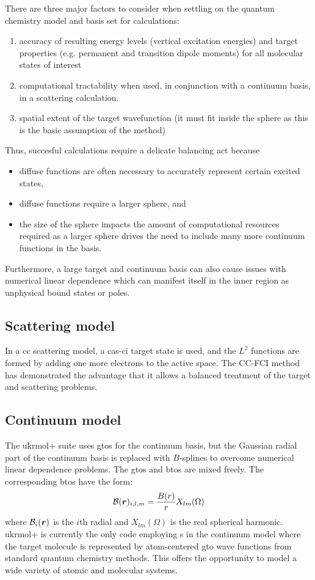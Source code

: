 There are three major factors to consider when settling on the 
quantum chemistry model and basis set for \rmat{} calculations:
\begin{enumerate}
		\item accuracy of resulting energy
				levels (vertical excitation energies) and target properties (e.g.
				permanent and transition dipole moments) for all molecular
				states of interest
		\item computational tractability when used, in conjunction with a
				continuum basis, in a scattering calculation. 
		\item spatial extent of the target wavefunction (it must fit inside the \rmat{} sphere as this is
				the basic assumption of the method) 
\end{enumerate}	
Thus, succesful \rmat{} calculations require a delicate balancing act because
\begin{itemize}
		\item diffuse functions are
				often necessary to accurately represent certain excited states,
		\item diffuse functions require a larger \rmat{} sphere, and
		\item the size of the \rmat{} sphere impacts the amount of
				computational resources required as a larger sphere 
				drives the need to include many more continuum functions in the basis.
\end{itemize}
Furthermore, a large target and continuum basis can also
cause issues with numerical linear dependence which can
manifest itself in the inner region as unphysical bound states
or \rmat{} poles.

\subsection{Scattering model}
In a \ac{cc} scattering model, a \ac{cas}-\ac{ci} target state 
is used, and the $L^2$ functions are
formed by adding one more electrons to the active space. 
The CC-FCI method has demonstrated the advantage that it allows a balanced treatment
of the target and scattering problems.

\subsection{Continuum model}
The \ac{ukrmol+} suite uses \acp{gto} for the continuum basis, but
the Gaussian radial part of the continuum basis
is replaced with $B$-splines to overcome numerical linear dependence problems. 
The \acp{gto} and \acp{bto} are mixed freely.
The corresponding
\acp{bto} have the form:
\begin{equation}
		\mathcal{B}(\boldsymbol{r})_{i,l,m} = \frac{B(r)}{r} X_{lm}(\Omega)
\end{equation}
where $\mathcal{B}_i(\boldsymbol{r})$ is the $i$th radial \bspline{} 
and $X_{lm}(\Omega)$ is the real spherical harmonic. 
\ac{ukrmol+} is currently the only \rmat code employing \bspline s 
in the continuum model
where the target molecule is represented by atom-centered \ac{gto} 
wave functions from standard
quantum chemistry methods. This offers the opportunity to model
a wide variety of atomic and molecular systems.

